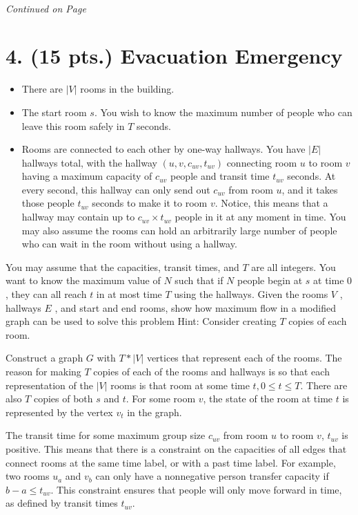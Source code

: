 \documentclass[11pt]{article}
\begin{document}
\paragraph{} \emph{Continued on Page \pageref{pg:p3-continuation}}

\newpage

\section*{4.  (15 pts.) Evacuation Emergency}

\begin{itemize}
  \item There are $|V|$ rooms in the building.
  \item The start room $s$. You wish to know the maximum number of people 
    who can leave this room safely in $T$ seconds.
  \item Rooms are connected to each other by one-way hallways. You have $|E|$
    hallways total, with the hallway $(u,v,c_{uv},t_{uv})$ connecting room $u$
    to room $v$ having a maximum capacity of $c_{uv}$ people and transit 
    time $t_{uv}$ seconds. At every second, this hallway can only send out 
    $c_{uv}$ from room $u$, and it takes those people $t_{uv}$ seconds to make 
    it to room $v$. Notice, this means that a hallway may contain up to 
    $c_{uv} \times t_{uv}$ people in it at any moment in time. 
    You may also assume the rooms can hold an arbitrarily large number of 
    people who can wait in the room without using a hallway.
\end{itemize}

You may assume that the capacities, transit times, and $T$ are all integers. 
You want to know the maximum value of $N$ such that if $N$ people begin at $s$ 
at time $0$, they can all reach $t$ in at most time $T$ using the hallways. 
Given the rooms $V$ , hallways $E$ , and start and end rooms, show how maximum 
flow in a modified graph can be used to solve this problem
Hint: Consider creating $T$ copies of each room.

Construct a graph $G$ with $T*|V|$ vertices that represent each of the rooms.
The reason for making $T$ 
copies of each of the rooms and hallways is so that each representation of the $|V|$ 
rooms is that room at some time $t, 0\leq t \leq T$. There are also $T$ copies of 
both $s$ and $t$. For some room  $v$, the state of the room at time $t$ is 
represented by the vertex $v_t$ in the graph.

The transit time for some maximum group size $c_{uv}$ from room $u$ to
room $v$, $t_{uv}$ is positive. This means that there is a constraint on the 
capacities of all edges that connect rooms at the same time label, or with a past
time label. For example, two rooms $u_a$ and $v_b$ can only have a nonnegative 
person transfer capacity if $b-a \leq t_{uv}$. This constraint ensures that people
will only move forward in time, as defined by transit times $t_{uv}$. 
\end{document}
